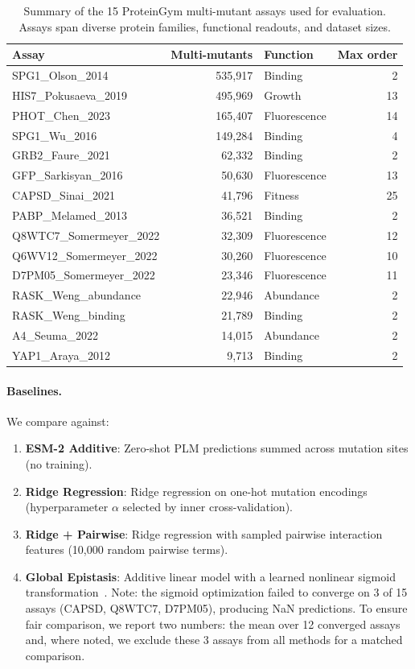 \documentclass{article}
\begin{document}
\begin{table}[t]
\caption{Summary of the 15 ProteinGym multi-mutant assays used for evaluation. Assays span diverse protein families, functional readouts, and dataset sizes.}
\label{tab:datasets}
\centering
\small
\begin{tabular}{lrlr}
\toprule
Assay & Multi-mutants & Function & Max order \\
\midrule
SPG1\_Olson\_2014 & 535{,}917 & Binding & 2 \\
HIS7\_Pokusaeva\_2019 & 495{,}969 & Growth & 13 \\
PHOT\_Chen\_2023 & 165{,}407 & Fluorescence & 14 \\
SPG1\_Wu\_2016 & 149{,}284 & Binding & 4 \\
GRB2\_Faure\_2021 & 62{,}332 & Binding & 2 \\
GFP\_Sarkisyan\_2016 & 50{,}630 & Fluorescence & 13 \\
CAPSD\_Sinai\_2021 & 41{,}796 & Fitness & 25 \\
PABP\_Melamed\_2013 & 36{,}521 & Binding & 2 \\
Q8WTC7\_Somermeyer\_2022 & 32{,}309 & Fluorescence & 12 \\
Q6WV12\_Somermeyer\_2022 & 30{,}260 & Fluorescence & 10 \\
D7PM05\_Somermeyer\_2022 & 23{,}346 & Fluorescence & 11 \\
RASK\_Weng\_abundance & 22{,}946 & Abundance & 2 \\
RASK\_Weng\_binding & 21{,}789 & Binding & 2 \\
A4\_Seuma\_2022 & 14{,}015 & Abundance & 2 \\
YAP1\_Araya\_2012 & 9{,}713 & Binding & 2 \\
\bottomrule
\end{tabular}
\end{table}

\paragraph{Baselines.} We compare against:
\begin{enumerate}
    \item \textbf{ESM-2 Additive}: Zero-shot PLM predictions summed across mutation sites (no training).
    \item \textbf{Ridge Regression}: Ridge regression on one-hot mutation encodings (hyperparameter $\alpha$ selected by inner cross-validation).
    \item \textbf{Ridge + Pairwise}: Ridge regression with sampled pairwise interaction features (10{,}000 random pairwise terms).
    \item \textbf{Global Epistasis}: Additive linear model with a learned nonlinear sigmoid transformation~\citep{otwinowski2025interpretable}. Note: the sigmoid optimization failed to converge on 3 of 15 assays (CAPSD, Q8WTC7, D7PM05), producing NaN predictions. To ensure fair comparison, we report two numbers: the mean over 12 converged assays and, where noted, we exclude these 3 assays from all methods for a matched comparison.
\end{enumerate}
\end{document}
